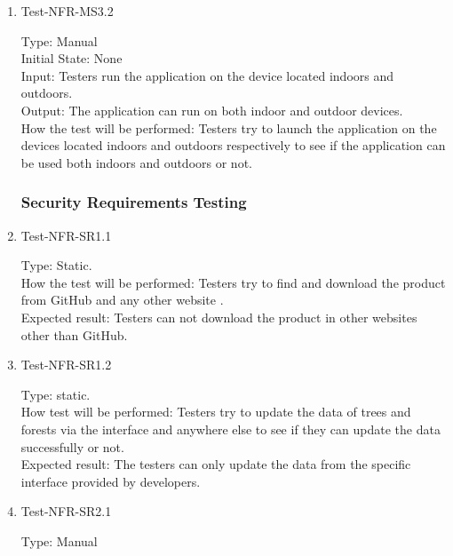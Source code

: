 \documentclass[12pt, titlepage]{article}
\begin{document}
\begin{enumerate}
\item{Test-NFR-MS3.2\\}

Type: Manual\\

Initial State: None\\

Input: Testers run the application on the device located indoors and outdoors.\\

Output: The application can run on both indoor and outdoor devices.\\

How the test will be performed: Testers try to launch the application on the devices located indoors and outdoors respectively to see if the application can be used both indoors and outdoors or not.  


\subsubsection{Security Requirements Testing}

\item{Test-NFR-SR1.1\\}

Type: Static.\\

How the test will be performed: Testers try to find and download the product from GitHub and any other website .\\

Expected result: Testers can not download the product in other websites other than GitHub.

\item{Test-NFR-SR1.2\\}

Type: static.\\

How test will be performed: Testers try to update the data of trees and forests via the interface and anywhere else to see if they can update the data successfully or not.\\

Expected result: The testers can only update the data from the specific interface provided by developers.


\item{Test-NFR-SR2.1\\}

Type: Manual\\


\end{enumerate}
\end{document}
